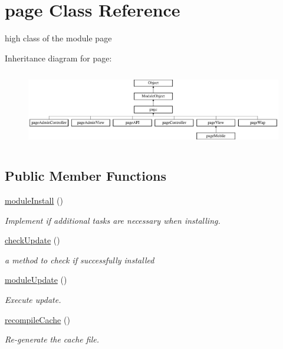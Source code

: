 \hypertarget{classpage}{}\section{page Class Reference}
\label{classpage}


high class of the module page  


Inheritance diagram for page\+:\begin{figure}[H]
\begin{center}
\leavevmode
\includegraphics[height=3.357314cm]{classpage}
\end{center}
\end{figure}
\subsection*{Public Member Functions}
\begin{DoxyCompactItemize}
\item 
\hyperlink{classpage_ae25169ce6659a05e22c369edcdef2f16}{module\+Install} ()
\begin{DoxyCompactList}\small\item\em Implement if additional tasks are necessary when installing. \end{DoxyCompactList}\item 
\hyperlink{classpage_ad635ecff86f3837caf39e0a13f714321}{check\+Update} ()
\begin{DoxyCompactList}\small\item\em a method to check if successfully installed \end{DoxyCompactList}\item 
\hyperlink{classpage_a4fe60dcc5953114b95b52dd89d9ba3db}{module\+Update} ()
\begin{DoxyCompactList}\small\item\em Execute update. \end{DoxyCompactList}\item 
\hyperlink{classpage_a0943a9455bc9f6c904f29235b3234e14}{recompile\+Cache} ()
\begin{DoxyCompactList}\small\item\em Re-\/generate the cache file. \end{DoxyCompactList}\end{DoxyCompactItemize}

